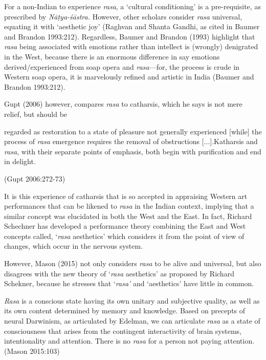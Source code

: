 \vfill\eject

For a non-Indian to experience \textsl{rasa}, a ‘cultural conditioning’ is a pre-requisite, as prescribed by \textsl{Nāṭya-śāstra.} However, other scholars consider \textsl{rasa} universal, equating it with ‘aesthetic joy’ (Raghvan and Shanta Gandhi, as cited in Baumer and Brandon 1993:212).  Regardless, Baumer and Brandon (1993) highlight that \textsl{rasa} being associated with emotions rather than intellect is (wrongly) denigrated in the West, because there is an enormous difference in say emotions derived/experienced from soap opera and \textsl{rasa}---for, the process is crude in Western soap opera, it is marvelously refined and artistic in India (Baumer and Brandon 1993:212).

Gupt (2006) however, compares \textsl{rasa} to catharsis, which he says is not mere relief, but should be 

\begin{myquote}
regarded as restoration to a state of pleasure not generally experienced [while] the process of \textsl{rasa} emergence requires the removal of obstructions [...].Katharsis and \textsl{rasa}, with their separate points of emphasis, both begin with purification and end in delight. 

\hfill (Gupt 2006:272-73)
\end{myquote}

It is this experience of catharsis that is so accepted in appraising Western art performances that can be likened to \textsl{rasa} in the Indian context, implying that a similar concept was elucidated in both the West and the East. In fact, Richard Schechner has developed a performance theory combining the East and West concepts called, ‘\textsl{rasa} aesthetics’ which considers it from the point of view of changes, which occur in the nervous system. 

However, Mason (2015) not only considers \textsl{rasa} to be alive and universal, but also disagrees with the new theory of ‘\textsl{rasa} aesthetics’ as proposed by Richard Schekner, because he stresses that ‘\textsl{rasa’} and ‘aesthetics’ have little in common. 

\begin{myquote}
\textsl{Rasa} is a conscious state having its own unitary and subjective quality, as well as its own content determined by memory and knowledge. Based on precepts of neural Darwinism, as articulated by Edelman, we can articulate \textsl{rasa} as a state of consciousness that arises from the contingent interactivity of brain systems, intentionality and attention. There is no \textsl{rasa} for a person not paying attention.    
\hfill (Mason 2015:103)
\end{myquote}

